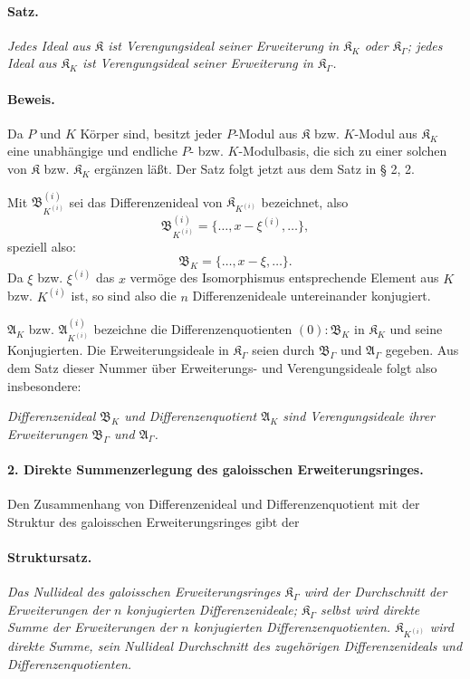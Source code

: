 \paragraph{Satz.}
\emph{Jedes Ideal aus $\mathfrak K$ ist Verengungsideal seiner Erweiterung in $\mathfrak K_K$ oder $\mathfrak K_\Gamma$; jedes Ideal aus $\mathfrak K_K$ ist Verengungsideal seiner Erweiterung in $\mathfrak K_\Gamma$.}

\paragraph{Beweis.}
Da $P$ und $K$ Körper sind, besitzt jeder $P$-Modul aus $\mathfrak K$ bzw. $K$-Modul aus $\mathfrak K_K$ eine unabhängige und endliche $P$- bzw. $K$-Modulbasis, die sich zu einer solchen von $\mathfrak K$ bzw. $\mathfrak K_K$ ergänzen läßt. Der Satz folgt jetzt aus dem Satz in § 2, 2.

Mit $\mathfrak B_{K^{(i)}}^{(i)}$ sei das Differenzenideal von $\mathfrak K_{K^{(i)}}$ bezeichnet, also
\[
\mathfrak B_{K^{(i)}}^{(i)}=\{\ldots,x-\xi^{(i)},\ldots\},
\]
speziell also:
\[
\mathfrak B_K=\{\ldots,x-\xi,\ldots\}.
\]
Da $\xi$ bzw. $\xi^{(i)}$ das $x$ vermöge des Isomorphismus entsprechende Element aus $K$ bzw. $K^{(i)}$ ist, so sind also die $n$ Differenzenideale untereinander konjugiert.

$\mathfrak A_K$ bzw. $\mathfrak A_{K^{(i)}}^{(i)}$ bezeichne die Differenzenquotienten $(0):\mathfrak B_K$ in $\mathfrak K_K$ und seine Konjugierten. Die Erweiterungsideale in $\mathfrak K_\Gamma$ seien durch $\mathfrak B_\Gamma$ und $\mathfrak A_\Gamma$ gegeben. Aus dem Satz dieser Nummer über Erweiterungs- und Verengungsideale folgt also insbesondere:

\emph{Differenzenideal $\mathfrak B_K$ und Differenzenquotient $\mathfrak A_K$ sind Verengungsideale ihrer Erweiterungen $\mathfrak B_\Gamma$ und $\mathfrak A_\Gamma$.}

\paragraph{2. Direkte Summenzerlegung des galoisschen Erweiterungsringes.}
Den Zusammenhang von Differenzenideal und Differenzenquotient mit der Struktur des galoisschen Erweiterungsringes gibt der

\paragraph{Struktursatz.}
\emph{Das Nullideal des galoisschen Erweiterungsringes $\mathfrak K_\Gamma$ wird der Durchschnitt der Erweiterungen der $n$ konjugierten Differenzenideale; $\mathfrak K_\Gamma$ selbst wird direkte Summe der Erweiterungen der $n$ konjugierten Differenzenquotienten. $\mathfrak K_{K^{(i)}}$ wird direkte Summe, sein Nullideal Durchschnitt des zugehörigen Differenzenideals und Differenzenquotienten.}

